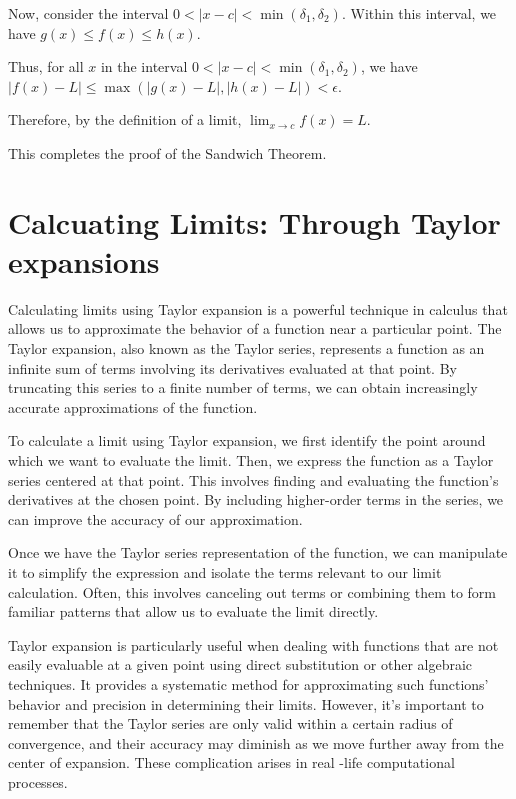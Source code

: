 Now, consider the interval $0 < |x - c| < \min(\delta_1, \delta_2)$. Within this interval, we have $g(x) \leq f(x) \leq h(x)$. 

Thus, for all $x$ in the interval $0 < |x - c| < \min(\delta_1, \delta_2)$, we have $|f(x) - L| \leq \max(|g(x) - L|, |h(x) - L|) < \epsilon$.

Therefore, by the definition of a limit, $\lim_{x \to c} f(x) = L$.

This completes the proof of the Sandwich Theorem.

\section{Calcuating Limits: Through Taylor expansions}

Calculating limits using Taylor expansion is a powerful technique in calculus that allows us to approximate the behavior of a function near a particular point. The Taylor expansion, also known as the Taylor series, represents a function as an infinite sum of terms involving its derivatives evaluated at that point. By truncating this series to a finite number of terms, we can obtain increasingly accurate approximations of the function.

To calculate a limit using Taylor expansion, we first identify the point around which we want to evaluate the limit. Then, we express the function as a Taylor series centered at that point. This involves finding and evaluating the function's derivatives at the chosen point. By including higher-order terms in the series, we can improve the accuracy of our approximation.

Once we have the Taylor series representation of the function, we can manipulate it to simplify the expression and isolate the terms relevant to our limit calculation. Often, this involves canceling out terms or combining them to form familiar patterns that allow us to evaluate the limit directly.

Taylor expansion is particularly useful when dealing with functions that are not easily evaluable at a given point using direct substitution or other algebraic techniques. It provides a systematic method for approximating such functions' behavior and precision in determining their limits. However, it's important to remember that the Taylor series are only valid within a certain radius of convergence, and their accuracy may diminish as we move further away from the center of expansion. These complication arises in real -life computational processes. 

